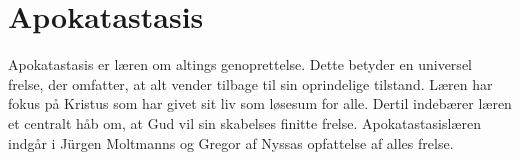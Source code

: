 \chapter{Apokatastasis}
Apokatastasis er læren om altings genoprettelse. Dette betyder en universel frelse, der omfatter, at alt vender tilbage til sin oprindelige tilstand. Læren har fokus på Kristus som har givet sit liv som løsesum for alle. Dertil indebærer læren et centralt håb om, at Gud vil sin skabelses finitte frelse. Apokatastasislæren indgår i Jürgen Moltmanns og Gregor af Nyssas opfattelse af alles frelse. 